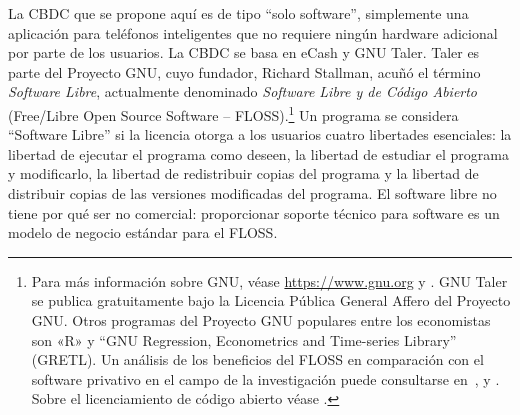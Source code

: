 \documentclass[a4paper,10pt]{article} %
\begin{document}
La CBDC que se propone aquí es de tipo ``solo software'', simplemente una
aplicación para teléfonos inteligentes que no requiere ningún hardware
adicional por parte de los usuarios. La CBDC se basa en eCash y GNU
Taler. Taler es parte del Proyecto GNU, cuyo fundador, Richard Stallman, acuñó
el término \emph{Software Libre}, actualmente denominado \emph{Software Libre
y de Código Abierto} (Free/Libre Open Source Software -- FLOSS).\footnote{Para
más información sobre GNU, véase \url{https://www.gnu.org} y
\citet{Stallman}. GNU Taler se publica gratuitamente bajo la Licencia Pública
General Affero del Proyecto GNU. Otros programas del Proyecto GNU populares
entre los economistas son «R» y ``GNU Regression, Econometrics and Time-series
Library'' (GRETL). Un análisis de los beneficios del FLOSS en comparación con
el software privativo en el campo de la investigación puede consultarse
en~\citet{Baiocchi}, \citet{Yalta2008} y \citet{Yalta2010}. Sobre el
licenciamiento de código abierto véase \citet{Lerner}.} Un programa se
considera ``Software Libre'' si la licencia otorga a los usuarios cuatro
libertades esenciales: la libertad de ejecutar el programa como deseen, la
libertad de estudiar el programa y modificarlo, la libertad de redistribuir
copias del programa y la libertad de distribuir copias de las versiones
modificadas del programa.  El software libre no tiene por qué ser no
comercial: proporcionar soporte técnico para software es un modelo de negocio
estándar para el FLOSS.
\end{document}
